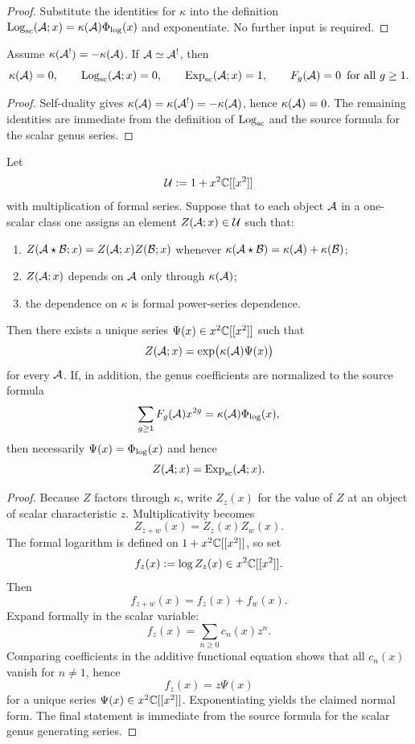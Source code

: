 \begin{proof}
Substitute the identities for $\kappa$ into the definition
$\mathrm{Log}_{\mathrm{sc}}(\mathcal{A};x)=\kappa(\mathcal{A})\Phi_{\log}(x)$ and exponentiate.  No further input is
required.\end{proof}

\begin{corollary}
\label{cor:self-dual-anomaly-neutrality}
Assume $\kappa(\mathcal{A}^!)=-\kappa(\mathcal{A})$.  If $\mathcal{A}\simeq \mathcal{A}^!$, then
\[
\kappa(\mathcal{A})=0,
\qquad
\mathrm{Log}_{\mathrm{sc}}(\mathcal{A};x)=0,
\qquad
\mathrm{Exp}_{\mathrm{sc}}(\mathcal{A};x)=1,
\qquad
F_g(\mathcal{A})=0\ \,\text{for all }g\ge 1.
\]
\end{corollary}

\begin{proof}
Self-duality gives $\kappa(\mathcal{A})=\kappa(\mathcal{A}^!)=-\kappa(\mathcal{A})$, hence
$\kappa(\mathcal{A})=0$.  The remaining identities are immediate from the definition of
$\mathrm{Log}_{\mathrm{sc}}$ and the source formula for the scalar genus series.\end{proof}

\begin{theorem}
\label{thm:classification-scalar-genera}
Let
\[
\mathcal{U}:=1+x^2\mathbb{C}[[x^2]]
\]
with multiplication of formal series.  Suppose that to each object $\mathcal{A}$ in a
one-scalar class one assigns an element $Z(\mathcal{A};x)\in\mathcal{U}$ such that:
\begin{enumerate}[label=\textup{(\alph*)}]
\item $Z(\mathcal{A}\star\mathcal{B};x)=Z(\mathcal{A};x)Z(\mathcal{B};x)$ whenever $\kappa(\mathcal{A}\star\mathcal{B})=\kappa(\mathcal{A})+\kappa(\mathcal{B})$;
\item $Z(\mathcal{A};x)$ depends on $\mathcal{A}$ only through $\kappa(\mathcal{A})$;
\item the dependence on $\kappa$ is formal power-series dependence.
\end{enumerate}
Then there exists a unique series $\Psi(x)\in x^2\mathbb{C}[[x^2]]$ such that
\[
Z(\mathcal{A};x)=\exp\bigl(\kappa(\mathcal{A})\Psi(x)\bigr)
\]
for every $\mathcal{A}$.  If, in addition, the genus coefficients are normalized to the
source formula
\[
\sum_{g\ge 1}F_g(\mathcal{A})x^{2g}=\kappa(\mathcal{A})\Phi_{\log}(x),
\]
then necessarily $\Psi(x)=\Phi_{\log}(x)$ and hence
\[
Z(\mathcal{A};x)=\mathrm{Exp}_{\mathrm{sc}}(\mathcal{A};x).
\]
\end{theorem}

\begin{proof}
Because $Z$ factors through $\kappa$, write $Z_z(x)$ for the value of $Z$ at an
object of scalar characteristic $z$.  Multiplicativity becomes
\[
Z_{z+w}(x)=Z_z(x)Z_w(x).
\]
The formal logarithm is defined on $1+x^2\mathbb{C}[[x^2]]$, so set
\[
f_z(x):=\log Z_z(x)\in x^2\mathbb{C}[[x^2]].
\]
Then
\[
f_{z+w}(x)=f_z(x)+f_w(x).
\]
Expand formally in the scalar variable:
\[
f_z(x)=\sum_{n\ge 0}c_n(x)z^n.
\]
Comparing coefficients in the additive functional equation shows that all
$c_n(x)$ vanish for $n\neq 1$, hence
\[
f_z(x)=z\Psi(x)
\]
for a unique series $\Psi(x)\in x^2\mathbb{C}[[x^2]]$.  Exponentiating yields the
claimed normal form.  The final statement is immediate from the source formula
for the scalar genus generating series.\end{proof}

